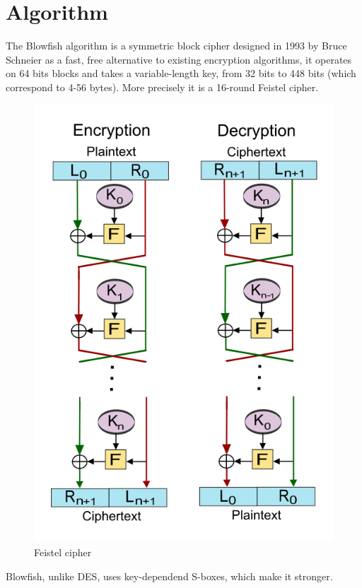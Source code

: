 \section{Algorithm}
The Blowfish algorithm is a symmetric block cipher designed in 1993 by Bruce Schneier as a fast, free alternative to existing encryption algorithms, it operates on 64 bits blocks and takes a variable-length key, from 32 bits to 448 bits (which correspond to 4-56 bytes).
More precisely it is a 16-round Feistel cipher. 

\begin{figure}[H]
\centering
\includegraphics[scale = 0.4]{./Pictures/Feistel_cipher} %
\caption{Feistel cipher}
\label{fig:Feistel cipher}
\end{figure}

Blowfish, unlike DES, uses key-dependend S-boxes, which make it stronger.


